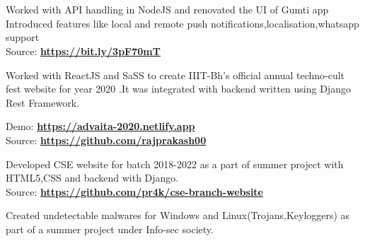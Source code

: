 \documentclass[]{deedy-resume-openfont}
\begin{document}
\begin{minipage}[t]{1\textwidth}
\section{}
Worked with API handling in NodeJS and renovated the UI of Gumti app\\Introduced features like local and remote push notifications,localisation,whatsapp support \\
Source: \textbf{\href{https://bit.ly/3pF70mT}{https://bit.ly/3pF70mT}}
\sectionsep

 Worked with ReactJS and SaSS to create IIIT-Bh's official annual techno-cult fest website for year 2020 .It was integrated with backend written using Django Rest Framework. 

Demo: \textbf{\href{https://advaita-2020.netlify.app}{https://advaita-2020.netlify.app}}\\
Source: \textbf{\href{https://github.com/rajprakash00}{https://github.com/rajprakash00}}

\sectionsep

Developed CSE website for batch 2018-2022 as a part of summer project with HTML5,CSS and backend with Django. \\
Source: \textbf{\href{https://github.com/pr4k/cse-branch-website}{https://github.com/pr4k/cse-branch-website}}
\sectionsep

Created undetectable malwares for Windows and
Linux(Trojans,Keyloggers) as part of a summer project under Info-sec society.

\end{minipage} 
\end{document}
